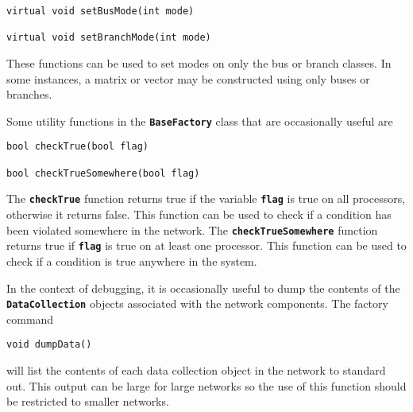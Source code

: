 {
\color{red}
\begin{Verbatim}[fontseries=b]
virtual void setBusMode(int mode)

virtual void setBranchMode(int mode)
\end{Verbatim}
}

These functions can be used to set modes on only the bus or branch classes. In
some instances, a matrix or vector may be constructed using only buses or
branches.

Some utility functions in the \texttt{\textbf{BaseFactory}} class that are occasionally useful are

{
\color{red}
\begin{Verbatim}[fontseries=b]
bool checkTrue(bool flag)

bool checkTrueSomewhere(bool flag)
\end{Verbatim}
}

The \texttt{\textbf{checkTrue}} function returns true if the variable \texttt{\textbf{flag}} is true on all processors, otherwise it returns false. This function can be used to check if a condition has been violated somewhere in the network. The \texttt{\textbf{checkTrueSomewhere}} function returns true if \texttt{\textbf{flag}} is true on at least one processor. This function can be used to check if a condition is true anywhere in the system.

In the context of debugging, it is occasionally useful to dump the contents of
the \texttt{\textbf{DataCollection}} objects associated with the network
components. The factory command

{
\color{red}
\begin{Verbatim}[fontseries=b]
void dumpData()
\end{Verbatim}
}

will list the contents of each data collection object in the network to standard
out. This output can be large for large networks so the use of this function
should be restricted to smaller networks.

